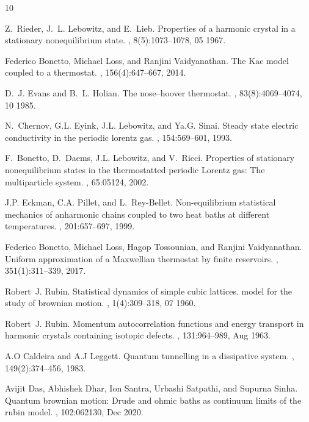 \documentclass[11pt]{article}
\numberwithin{equation}{section}
\numberwithin{theorem}{section}
\begin{document}
\begin{thebibliography}{10}

Z.~Rieder, J.~L. Lebowitz, and E.~Lieb.
\newblock Properties of a harmonic crystal in a stationary nonequilibrium
  state.
, 8(5):1073--1078, 05 1967.

Federico Bonetto, Michael Loss, and Ranjini Vaidyanathan.
\newblock The {K}ac model coupled to a thermostat.
, 156(4):647--667, 2014.

D.~J. Evans and B.~L. Holian.
\newblock The nose–hoover thermostat.
, 83(8):4069--4074, 10 1985.

N.~Chernov, G.L. Eyink, J.L. Lebowitz, and Ya.G. Sinai.
\newblock Steady state electric conductivity in the periodic lorentz gas.
, 154:569--601, 1993.

F.~Bonetto, D.~Daems, J.L. Lebowitz, and V.~Ricci.
\newblock Properties of stationary nonequilibrium states in the thermostatted
  periodic {L}orentz gas: The multiparticle system.
, 65:05124, 2002.

J.P. Eckman, C.A. Pillet, and L.~Rey-Bellet.
\newblock Non-equilibrium statistical mechanics of anharmonic chains coupled to
  two heat baths at different temperatures.
, 201:657--697, 1999.

Federico Bonetto, Michael Loss, Hagop Tossounian, and Ranjini Vaidyanathan.
\newblock Uniform approximation of a {M}axwellian thermostat by finite
  reservoirs.
, 351(1):311--339, 2017.

Robert~J. Rubin.
\newblock Statistical dynamics of simple cubic lattices. model for the study of
  brownian motion.
, 1(4):309--318, 07 1960.

Robert~J. Rubin.
\newblock Momentum autocorrelation functions and energy transport in harmonic
  crystals containing isotopic defects.
, 131:964--989, Aug 1963.

A.O Caldeira and A.J Leggett.
\newblock Quantum tunnelling in a dissipative system.
, 149(2):374--456, 1983.

Avijit Das, Abhishek Dhar, Ion Santra, Urbashi Satpathi, and Supurna Sinha.
\newblock Quantum brownian motion: Drude and ohmic baths as continuum limits of
  the rubin model.
, 102:062130, Dec 2020.


\end{thebibliography}
\end{document}
